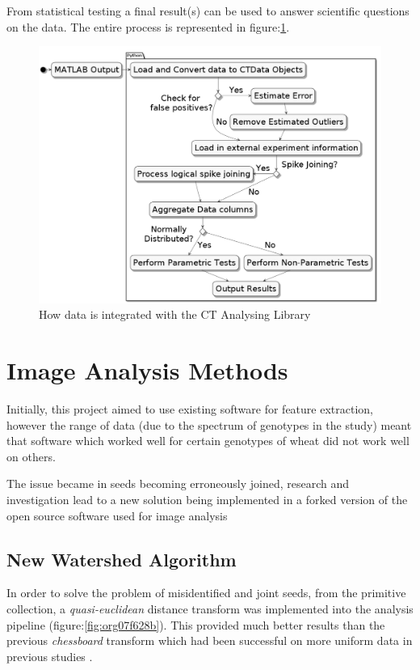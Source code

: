\documentclass[11pt]{report}
\begin{document}
From statistical testing a final result(s) can be used to answer scientific questions on the data. The entire process is represented in figure:\ref{fig:org60aeed4}.
\clearpage
\begin{figure}[htbp]
\centering
\includegraphics[width=18cm]{./images/pipeline.png}
\caption{\label{fig:org60aeed4}
How data is integrated with the CT Analysing Library}
\end{figure}

\section{Image Analysis Methods}
\label{sec:org8c30407}
Initially, this project aimed to use existing software for feature extraction, however the range of data (due to the spectrum of genotypes in the study) meant that software which worked well for certain genotypes of wheat did not work well on others.

The issue became in seeds becoming erroneously joined, research and investigation lead to a new solution being implemented in a forked version of the open source software used for image analysis \cite{Hughes2017}

\subsection{New Watershed Algorithm}
\label{sec:org2143011}

In order to solve the problem of misidentified and joint seeds, from the primitive collection,
a  \emph{quasi-euclidean} distance transform was implemented into the analysis pipeline (figure:\ref{fig:org07f628b}). This provided much better results than the previous
\emph{chessboard} transform which had been successful on more uniform data in previous studies \cite{Hughes2017}.
\end{document}
